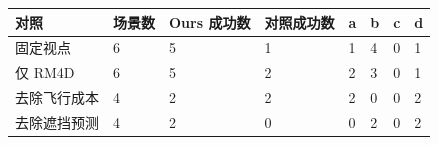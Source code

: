 \begin{tabular}{llllllll}
\toprule
对照 & 场景数 & Ours 成功数 & 对照成功数 & a & b & c & d \\
\midrule
固定视点 & 6 & 5 & 1 & 1 & 4 & 0 & 1 \\
仅 RM4D & 6 & 5 & 2 & 2 & 3 & 0 & 1 \\
去除飞行成本 & 4 & 2 & 2 & 2 & 0 & 0 & 2 \\
去除遮挡预测 & 4 & 2 & 0 & 0 & 2 & 0 & 2 \\
\bottomrule
\end{tabular}
